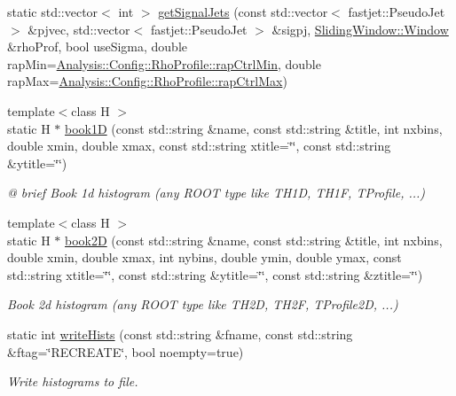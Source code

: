\begin{DoxyCompactItemize}
\item 
static std\+::vector$<$ int $>$ \hyperlink{structAnalysisHelper_a17353636d708a92d6968f406a1fbc1c9}{get\+Signal\+Jets} (const std\+::vector$<$ fastjet\+::\+Pseudo\+Jet $>$ \&pjvec, std\+::vector$<$ fastjet\+::\+Pseudo\+Jet $>$ \&sigpj, \hyperlink{classSlidingWindow_1_1Window}{Sliding\+Window\+::\+Window} \&rho\+Prof, bool use\+Sigma, double rap\+Min=\hyperlink{namespaceAnalysis_1_1Config_1_1RhoProfile_a6a12ebe70b6648825eead16dff1159fd}{Analysis\+::\+Config\+::\+Rho\+Profile\+::rap\+Ctrl\+Min}, double rap\+Max=\hyperlink{namespaceAnalysis_1_1Config_1_1RhoProfile_ab78a2585916e0761da7090b86d5c762b}{Analysis\+::\+Config\+::\+Rho\+Profile\+::rap\+Ctrl\+Max})
\item 
{\footnotesize template$<$class H $>$ }\\static H $\ast$ \hyperlink{structAnalysisHelper_aed9c208e64246584fdd10a188121c137}{book1D} (const std\+::string \&name, const std\+::string \&title, int nxbins, double xmin, double xmax, const std\+::string xtitle=\char`\"{}\char`\"{}, const std\+::string \&ytitle=\char`\"{}\char`\"{})
\begin{DoxyCompactList}\small\item\em @ brief Book 1d histogram (any R\+O\+OT type like T\+H1D, T\+H1F, T\+Profile, ...) \end{DoxyCompactList}\item 
{\footnotesize template$<$class H $>$ }\\static H $\ast$ \hyperlink{structAnalysisHelper_aeaac2042accbd686e35518691e6b181b}{book2D} (const std\+::string \&name, const std\+::string \&title, int nxbins, double xmin, double xmax, int nybins, double ymin, double ymax, const std\+::string xtitle=\char`\"{}\char`\"{}, const std\+::string \&ytitle=\char`\"{}\char`\"{}, const std\+::string \&ztitle=\char`\"{}\char`\"{})
\begin{DoxyCompactList}\small\item\em Book 2d histogram (any R\+O\+OT type like T\+H2D, T\+H2F, T\+Profile2D, ...) \end{DoxyCompactList}\item 
static int \hyperlink{structAnalysisHelper_a8d8a117fe4692b12e538cf9f7b922e3a}{write\+Hists} (const std\+::string \&fname, const std\+::string \&ftag=\char`\"{}R\+E\+C\+R\+E\+A\+TE\char`\"{}, bool noempty=true)
\begin{DoxyCompactList}\small\item\em Write histograms to file. \end{DoxyCompactList}\end{DoxyCompactItemize}


